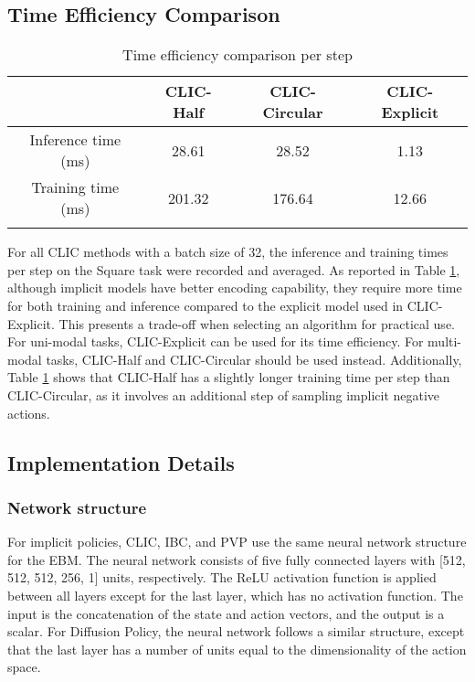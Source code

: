 \subsection{Time Efficiency Comparison}
\begin{table}[h]
\caption{Time efficiency comparison per step}
\label{tab:appendix:Time_efficience_comparison}
\begin{center}
\begin{tabular}{cccc}
\Xhline{0.75pt}
                    & CLIC-Half & CLIC-Circular & CLIC-Explicit \\ \hline
Inference time (ms) & 28.61        & 28.52            & 1.13             \\
Training time (ms)  &    201.32        &    176.64          &      12.66           \\ \Xhline{0.75pt}
\end{tabular}
\end{center}
\end{table}
\label{appendix:time_efficiency_comparision}
For all CLIC methods with a batch size of 32, the inference and training times per step on the Square task were recorded and averaged.
As reported in Table \ref{tab:appendix:Time_efficience_comparison}, although implicit models have better encoding capability, they require more time for both training and inference compared to the explicit model used in CLIC-Explicit.
This presents a trade-off when selecting an algorithm for practical use.  For uni-modal tasks, CLIC-Explicit can be used for its time efficiency. For multi-modal tasks, CLIC-Half and CLIC-Circular should be used instead. 
Additionally, Table \ref{tab:appendix:Time_efficience_comparison} shows that CLIC-Half has a slightly longer training time per step than CLIC-Circular, as it involves an additional step of sampling implicit negative actions.





\subsection{Implementation Details}
\subsubsection{Network structure}
For implicit policies, CLIC, IBC, and PVP use the same neural network structure for the EBM. 
The neural network consists of five fully connected layers with [512, 512, 512, 256, 1] units, respectively.
The ReLU activation function is applied between all layers except for the last layer, which has no activation function.
The input is the concatenation of the state and action vectors, and the output is a scalar. 
For Diffusion Policy, the neural network follows a similar structure, except that the last layer has a number of units equal to the dimensionality of the action space. 



